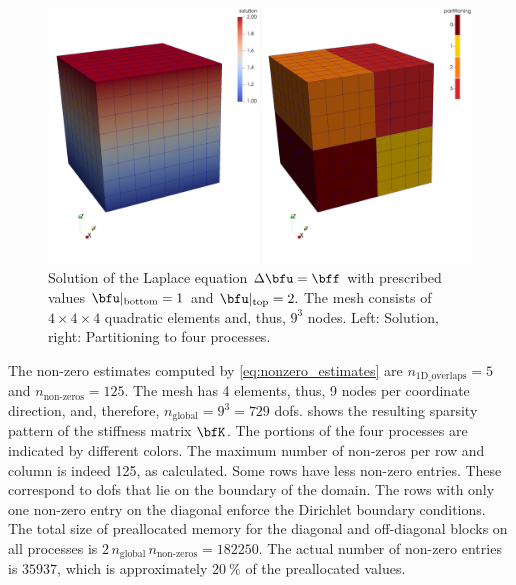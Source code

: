 \begin{figure}%
  \centering%
  \includegraphics[width=\textwidth]{images/implementation/3d_laplace.png}%
  \caption{Solution of the Laplace equation $ \Delta\bfu = \bff$ with prescribed values $\bfu|_\text{bottom}=1$ and $\bfu|_\text{top}=2.$ The mesh consists of $4\times 4\times 4$ quadratic elements and, thus, $9^3$ nodes. Left: Solution, right: Partitioning to four processes.}
  \label{fig:3d_laplace}%
\end{figure}%

The non-zero estimates computed by \cref{eq:nonzero_estimates} are $n_\text{1D\_overlaps}=5$ and $n_\text{non-zeros} = 125$. The mesh has 4 elements, thus, 9 nodes per coordinate direction, and, therefore, $n_\text{global} = 9^3 = 729$ dofs.
 shows the resulting sparsity pattern of the stiffness matrix $\bfK$. The portions of the four processes are indicated by different colors. The maximum number of non-zeros per row and column is indeed 125, as calculated. Some rows have less non-zero entries. These correspond to dofs that lie on the boundary of the domain. The rows with only one non-zero entry on the diagonal enforce the Dirichlet boundary conditions. 
The total size of preallocated memory for the diagonal and off-diagonal blocks on all processes is $2\,n_\text{global}\,n_\text{non-zeros} = \num{182250}$. The actual number of non-zero entries is $\num{35937}$, which is approximately $\SI{20}{\percent}$ of the preallocated values.


